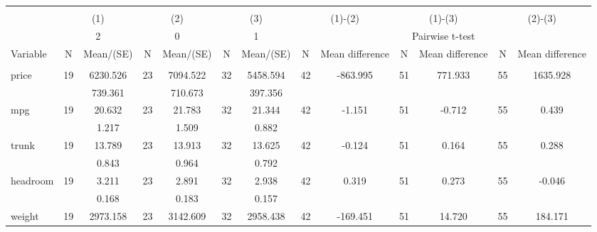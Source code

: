 
\begin{tabular}{@{\extracolsep{5pt}}lcccccccccccc}
\\[-1.8ex]\hline \hline \\[-1.8ex]
 & \multicolumn{2}{c}{(1)}  & \multicolumn{2}{c}{(2)}  & \multicolumn{2}{c}{(3)}  & \multicolumn{2}{c}{(1)-(2)} & \multicolumn{2}{c}{(1)-(3)} & \multicolumn{2}{c}{(2)-(3)} \\
 & \multicolumn{2}{c}{2}  & \multicolumn{2}{c}{0}  & \multicolumn{2}{c}{1}  & \multicolumn{6}{c}{Pairwise t-test}  \\
Variable & N & Mean/(SE) & N & Mean/(SE) & N & Mean/(SE) & N & Mean difference & N & Mean difference & N & Mean difference \\ \hline \\[-1.8ex] 
price   & 19    &  6230.526    & 23    &  7094.522    & 32    &  5458.594    & 42    &  -863.995    & 51    &   771.933    & 55    &  1635.928   \\
 &   &   739.361  &   &   710.673  &   &   397.356  &   &  &   &  &   &   \\
mpg   & 19    &    20.632    & 23    &    21.783    & 32    &    21.344    & 42    &    -1.151    & 51    &    -0.712    & 55    &     0.439   \\
 &   &     1.217  &   &     1.509  &   &     0.882  &   &  &   &  &   &   \\
trunk   & 19    &    13.789    & 23    &    13.913    & 32    &    13.625    & 42    &    -0.124    & 51    &     0.164    & 55    &     0.288   \\
 &   &     0.843  &   &     0.964  &   &     0.792  &   &  &   &  &   &   \\
headroom   & 19    &     3.211    & 23    &     2.891    & 32    &     2.938    & 42    &     0.319    & 51    &     0.273    & 55    &    -0.046   \\
 &   &     0.168  &   &     0.183  &   &     0.157  &   &  &   &  &   &   \\
weight   & 19    &  2973.158    & 23    &  3142.609    & 32    &  2958.438    & 42    &  -169.451    & 51    &    14.720    & 55    &   184.171   \\

\end{tabular}
